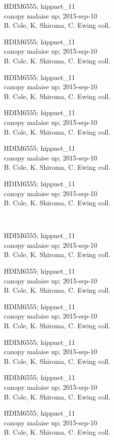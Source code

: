 \documentclass[2pt]{extarticle}
\begin{document}
\noindent
\parbox{0.16\textwidth}{\tiny \raggedright \rule[-0.3\baselineskip]{0pt}{10pt}HDIM6555; hippnet\_11\\ canopy malaise up; 2015-sep-10\\ B. Cole, K. Shiroma, C. Ewing coll.}
\parbox{0.16\textwidth}{\tiny \raggedright \rule[-0.3\baselineskip]{0pt}{10pt}HDIM6555; hippnet\_11\\ canopy malaise up; 2015-sep-10\\ B. Cole, K. Shiroma, C. Ewing coll.}
\parbox{0.16\textwidth}{\tiny \raggedright \rule[-0.3\baselineskip]{0pt}{10pt}HDIM6555; hippnet\_11\\ canopy malaise up; 2015-sep-10\\ B. Cole, K. Shiroma, C. Ewing coll.}
\parbox{0.16\textwidth}{\tiny \raggedright \rule[-0.3\baselineskip]{0pt}{10pt}HDIM6555; hippnet\_11\\ canopy malaise up; 2015-sep-10\\ B. Cole, K. Shiroma, C. Ewing coll.}
\parbox{0.16\textwidth}{\tiny \raggedright \rule[-0.3\baselineskip]{0pt}{10pt}HDIM6555; hippnet\_11\\ canopy malaise up; 2015-sep-10\\ B. Cole, K. Shiroma, C. Ewing coll.}
\parbox{0.16\textwidth}{\tiny \raggedright \rule[-0.3\baselineskip]{0pt}{10pt}HDIM6555; hippnet\_11\\ canopy malaise up; 2015-sep-10\\ B. Cole, K. Shiroma, C. Ewing coll.} \\ 
\vspace{0.001in} 

\noindent
\parbox{0.16\textwidth}{\tiny \raggedright \rule[-0.3\baselineskip]{0pt}{10pt}HDIM6555; hippnet\_11\\ canopy malaise up; 2015-sep-10\\ B. Cole, K. Shiroma, C. Ewing coll.}
\parbox{0.16\textwidth}{\tiny \raggedright \rule[-0.3\baselineskip]{0pt}{10pt}HDIM6555; hippnet\_11\\ canopy malaise up; 2015-sep-10\\ B. Cole, K. Shiroma, C. Ewing coll.}
\parbox{0.16\textwidth}{\tiny \raggedright \rule[-0.3\baselineskip]{0pt}{10pt}HDIM6555; hippnet\_11\\ canopy malaise up; 2015-sep-10\\ B. Cole, K. Shiroma, C. Ewing coll.}
\parbox{0.16\textwidth}{\tiny \raggedright \rule[-0.3\baselineskip]{0pt}{10pt}HDIM6555; hippnet\_11\\ canopy malaise up; 2015-sep-10\\ B. Cole, K. Shiroma, C. Ewing coll.}
\parbox{0.16\textwidth}{\tiny \raggedright \rule[-0.3\baselineskip]{0pt}{10pt}HDIM6555; hippnet\_11\\ canopy malaise up; 2015-sep-10\\ B. Cole, K. Shiroma, C. Ewing coll.}
\parbox{0.16\textwidth}{\tiny \raggedright \rule[-0.3\baselineskip]{0pt}{10pt}HDIM6555; hippnet\_11\\ canopy malaise up; 2015-sep-10\\ B. Cole, K. Shiroma, C. Ewing coll.} \\ 
\vspace{0.001in} 
\end{document}
